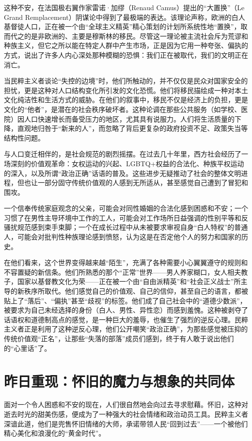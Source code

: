 这种不安，在法国极右翼作家雷诺·加缪（Renaud Camus）提出的“大置换”（Le Grand Remplacement）阴谋论中得到了最极端的表达。该理论声称，欧洲的白人基督徒人口，正在被一个由“全球主义精英”精心策划的计划所系统性地“置换”，取而代之的是非欧洲的、主要是穆斯林的移民。尽管这一理论被主流社会斥为荒谬和种族主义，但它之所以能在特定人群中产生市场，正是因为它用一种夸张、偏执的方式，说出了许多人内心深处那种模糊的恐惧：我们正在被取代，我们的文明正在消亡。

当民粹主义者谈论“失控的边境”时，他们所触动的，并不仅仅是民众对国家安全的担忧，更是这种对人口结构变化所引发的文化恐慌。他们将移民描绘成一种对本土文化纯洁性和生活方式的威胁。在他们的叙事中，移民不仅是经济上的负担，更是文化的“他者”，是潜在的社会秩序破坏者。这种论调在那些公共服务（如学校、医院）因人口快速增长而备受压力的地区，尤其具有说服力。人们将生活质量的下降，直观地归咎于“新来的人”，而忽略了背后更复杂的政府投资不足、政策失当等结构性问题。

与人口变迁相伴的，是社会规范的剧烈摇摆。在过去几十年里，西方社会经历了一场深刻的价值观革命：女权运动的兴起、LGBTQ+权益的合法化、种族平权运动的深入，以及所谓“政治正确”话语的普及。这些进步无疑推动了社会的整体文明进程，但也让一部分固守传统价值观的人感到无所适从，甚至感觉自己遭到了冒犯和围攻。

一个信奉传统家庭观念的父亲，可能会对同性婚姻的合法化感到困惑和不安；一个习惯了在男性主导环境中工作的工人，可能会对工作场所日益强调的性别平等和反骚扰规范感到束手束脚；一个在成长过程中从未被要求审视自身“白人特权”的普通人，可能会对批判性种族理论感到愤怒，认为这是在否定他个人的努力和国家的历史。

在他们看来，这个世界变得越来越“陌生”，充满了各种需要小心翼翼遵守的规则和不容置疑的新信条。他们所熟悉的那个“正常”世界——男人养家糊口，女人相夫教子，国家以基督教文化为荣——正在被一个由“自由派精英”和“社会正义战士”所主导的新秩序所取代。他们感觉自己的价值观、自己的信仰，甚至自己的语言，都被贴上了“落后”、“偏执”甚至“歧视”的标签。他们成了自己社会中的“道德少数派”，被要求为自己未经选择的身份（白人、男性、异性恋）而感到羞愧。这种被剥夺了话语权和道德制高点的感觉，是一种巨大的羞辱，也催生了强烈的逆反心理。民粹主义者正是利用了这种逆反心理，他们公开嘲笑“政治正确”，为那些感觉被压抑的传统价值观“正名”，让那些“失落的部落”成员们感到，终于有人敢于说出他们的“心里话”了。

\section{昨日重现：怀旧的魔力与想象的共同体}

面对一个令人困惑和不安的现在，人们很自然地会向过去寻求慰藉。怀旧，这种对逝去时光的甜美伤感，便成为了一种强大的社会情绪和政治动员工具。民粹主义者深谙此道，他们是兜售怀旧情绪的大师，承诺带领人民“回到过去”——一个被他们精心美化和浪漫化的“黄金时代”。

